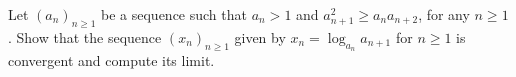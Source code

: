 Let $(a_n)_{n\ge 1}$ be a sequence such that $a_n > 1$ and $a_{n+1}^2 \ge a_n a_{n + 2}$, for any $n\ge 1$. Show that the sequence $(x_n)_{n\ge 1}$ given by $x_n = \log_{a_n} a_{n + 1}$ for $n\ge 1$ is convergent and compute its limit.